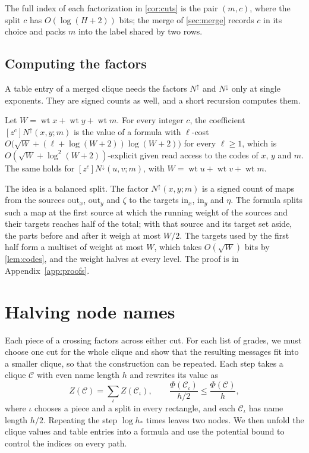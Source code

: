 \documentclass[11pt]{article}
\theoremstyle{definition}
\theoremstyle{definition}
\theoremstyle{remark}
\newcommand{\wt}{\operatorname{wt}}
\newcommand{\out}{\mathrm{out}}
\newcommand{\inn}{\mathrm{in}}
\newcommand{\Nup}{N^{\uparrow}}
\newcommand{\Ndown}{N^{\downarrow}}
\begin{document}
The full index of each factorization in \cref{cor:cuts} is the pair $(m,c)$, where the split $c$ has $O(\log(H+2))$ bits; the merge of \cref{sec:merge} records $c$ in its choice and packs $m$ into the label shared by two rows.

\subsection{Computing the factors}

A table entry of a merged clique needs the factors $\Nup$ and $\Ndown$ only at single exponents. They are signed counts as well, and a short recursion computes them.

\begin{lemma}\label{lem:transport}
Let $W=\wt x+\wt y+\wt m$. For every integer $c$, the coefficient $[z^c]\Nup(x,y;m)$ is the value of a formula with $\ell$-cost $O\bigl(\sqrt W+(\ell+\log(W+2))\log(W+2)\bigr)$ for every $\ell\ge1$, which is $O(\sqrt W+\log^2(W+2))$-explicit given read access to the codes of $x$, $y$ and $m$. The same holds for $[z^c]\Ndown(u,v;m)$, with $W=\wt u+\wt v+\wt m$.
\end{lemma}

The idea is a balanced split. The factor $\Nup(x,y;m)$ is a signed count of maps from the sources $\out_x$, $\out_y$ and $\zeta$ to the targets $\inn_x$, $\inn_y$ and $\eta$. The formula splits such a map at the first source at which the running weight of the sources and their targets reaches half of the total; with that source and its target set aside, the parts before and after it weigh at most $W/2$. The targets used by the first half form a multiset of weight at most $W$, which takes $O(\sqrt W)$ bits by \cref{lem:codes}, and the weight halves at every level. The proof is in Appendix~\ref{app:proofs}.

\section{Halving node names}\label{sec:halving}

Each piece of a crossing factors across either cut. For each list of grades, we must choose one cut for the whole clique and show that the resulting messages fit into a smaller clique, so that the construction can be repeated. Each step takes a clique $\mathcal C$ with even name length $h$ and rewrites its value as
\[
Z(\mathcal C)=\sum_\iota Z(\mathcal C_\iota),\qquad\frac{\Phi(\mathcal C_\iota)}{h/2}\le\frac{\Phi(\mathcal C)}h,
\]
where $\iota$ chooses a piece and a split in every rectangle, and each $\mathcal C_\iota$ has name length $h/2$. Repeating the step $\log h_*$ times leaves two nodes. We then unfold the clique values and table entries into a formula and use the potential bound to control the indices on every path.
\end{document}
